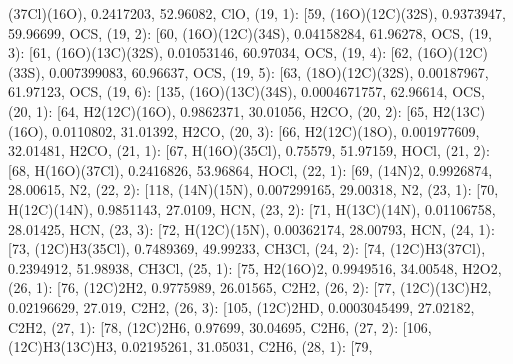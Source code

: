 \documentclass[letterpaper,10pt,english]{sphinxmanual}
\begin{document}
\begin{fulllineitems}
\textquotesingle{}(37Cl)(16O)\textquotesingle{}, 0.2417203, 52.96082, \textquotesingle{}ClO\textquotesingle{}{]}, (19, 1): {[}59, \textquotesingle{}(16O)(12C)(32S)\textquotesingle{}, 0.9373947, 59.96699, \textquotesingle{}OCS\textquotesingle{}{]}, (19, 2): {[}60, \textquotesingle{}(16O)(12C)(34S)\textquotesingle{}, 0.04158284, 61.96278, \textquotesingle{}OCS\textquotesingle{}{]}, (19, 3): {[}61, \textquotesingle{}(16O)(13C)(32S)\textquotesingle{}, 0.01053146, 60.97034, \textquotesingle{}OCS\textquotesingle{}{]}, (19, 4): {[}62, \textquotesingle{}(16O)(12C)(33S)\textquotesingle{}, 0.007399083, 60.96637, \textquotesingle{}OCS\textquotesingle{}{]}, (19, 5): {[}63, \textquotesingle{}(18O)(12C)(32S)\textquotesingle{}, 0.00187967, 61.97123, \textquotesingle{}OCS\textquotesingle{}{]}, (19, 6): {[}135, \textquotesingle{}(16O)(13C)(34S)\textquotesingle{}, 0.0004671757, 62.96614, \textquotesingle{}OCS\textquotesingle{}{]}, (20, 1): {[}64, \textquotesingle{}H2(12C)(16O)\textquotesingle{}, 0.9862371, 30.01056, \textquotesingle{}H2CO\textquotesingle{}{]}, (20, 2): {[}65, \textquotesingle{}H2(13C)(16O)\textquotesingle{}, 0.0110802, 31.01392, \textquotesingle{}H2CO\textquotesingle{}{]}, (20, 3): {[}66, \textquotesingle{}H2(12C)(18O)\textquotesingle{}, 0.001977609, 32.01481, \textquotesingle{}H2CO\textquotesingle{}{]}, (21, 1): {[}67, \textquotesingle{}H(16O)(35Cl)\textquotesingle{}, 0.75579, 51.97159, \textquotesingle{}HOCl\textquotesingle{}{]}, (21, 2): {[}68, \textquotesingle{}H(16O)(37Cl)\textquotesingle{}, 0.2416826, 53.96864, \textquotesingle{}HOCl\textquotesingle{}{]}, (22, 1): {[}69, \textquotesingle{}(14N)2\textquotesingle{}, 0.9926874, 28.00615, \textquotesingle{}N2\textquotesingle{}{]}, (22, 2): {[}118, \textquotesingle{}(14N)(15N)\textquotesingle{}, 0.007299165, 29.00318, \textquotesingle{}N2\textquotesingle{}{]}, (23, 1): {[}70, \textquotesingle{}H(12C)(14N)\textquotesingle{}, 0.9851143, 27.0109, \textquotesingle{}HCN\textquotesingle{}{]}, (23, 2): {[}71, \textquotesingle{}H(13C)(14N)\textquotesingle{}, 0.01106758, 28.01425, \textquotesingle{}HCN\textquotesingle{}{]}, (23, 3): {[}72, \textquotesingle{}H(12C)(15N)\textquotesingle{}, 0.00362174, 28.00793, \textquotesingle{}HCN\textquotesingle{}{]}, (24, 1): {[}73, \textquotesingle{}(12C)H3(35Cl)\textquotesingle{}, 0.7489369, 49.99233, \textquotesingle{}CH3Cl\textquotesingle{}{]}, (24, 2): {[}74, \textquotesingle{}(12C)H3(37Cl)\textquotesingle{}, 0.2394912, 51.98938, \textquotesingle{}CH3Cl\textquotesingle{}{]}, (25, 1): {[}75, \textquotesingle{}H2(16O)2\textquotesingle{}, 0.9949516, 34.00548, \textquotesingle{}H2O2\textquotesingle{}{]}, (26, 1): {[}76, \textquotesingle{}(12C)2H2\textquotesingle{}, 0.9775989, 26.01565, \textquotesingle{}C2H2\textquotesingle{}{]}, (26, 2): {[}77, \textquotesingle{}(12C)(13C)H2\textquotesingle{}, 0.02196629, 27.019, \textquotesingle{}C2H2\textquotesingle{}{]}, (26, 3): {[}105, \textquotesingle{}(12C)2HD\textquotesingle{}, 0.0003045499, 27.02182, \textquotesingle{}C2H2\textquotesingle{}{]}, (27, 1): {[}78, \textquotesingle{}(12C)2H6\textquotesingle{}, 0.97699, 30.04695, \textquotesingle{}C2H6\textquotesingle{}{]}, (27, 2): {[}106, \textquotesingle{}(12C)H3(13C)H3\textquotesingle{}, 0.02195261, 31.05031, \textquotesingle{}C2H6\textquotesingle{}{]}, (28, 1): {[}79, 
\end{fulllineitems}
\end{document}
